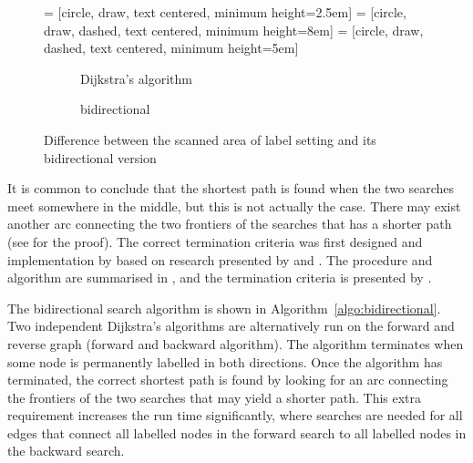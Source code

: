 \begin{figure}[!ht]
     = [circle, draw, text centered, minimum height=2.5em]
     = [circle, draw, dashed, text centered, minimum height=8em]
     = [circle, draw, dashed, text centered, minimum height=5em]
    \centering
    \begin{subfigure}[t]{.4\textwidth}
        \centering
        \caption{Dijkstra's algorithm}
    \end{subfigure}
    \begin{subfigure}[t]{.4\textwidth}
        \centering
        \caption{bidirectional}
    \end{subfigure}
    \caption{Difference between the scanned area of label setting and its bidirectional version}
    \label{fig:bidirect}
\end{figure}

It is common to conclude that the shortest path is found when the two searches meet somewhere in the middle,
but this is not actually the case.
There may exist another arc connecting the two frontiers of the searches that has a shorter path (see \citet{Klunder} for the proof).
The correct termination criteria was first designed and implementation by \citet{Pohl} based on research presented by \citet{Dantzig, Nicholson} and \citet{Dreyfus}.
The procedure and algorithm are summarised in \citet{Klunder}, and the termination criteria is presented by \citet{Pohl}.

The bidirectional search algorithm is shown in Algorithm~\ref{algo:bidirectional}.
Two independent Dijkstra's algorithms are alternatively run on the forward and reverse graph (forward and backward algorithm).
The algorithm terminates when some node is permanently labelled in both directions.
Once the algorithm has terminated,
the correct shortest path is found by looking for an arc connecting the frontiers of the two searches that may yield a shorter path.
This extra requirement increases the run time significantly, 
where searches are needed for all edges that connect all labelled nodes in the forward search to all labelled nodes in the backward search.

